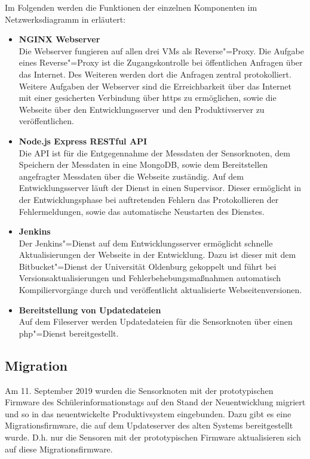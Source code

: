 \noindent
Im Folgenden werden die Funktionen der einzelnen Komponenten im Netzwerksdiagramm in  erläutert:
\begin{itemize}
\item	\textbf{NGINX Webserver}\\
Die Webserver fungieren auf allen drei VMs als Reverse"=Proxy.
Die Aufgabe eines Reverse"=Proxy ist die Zugangskontrolle bei öffentlichen Anfragen über das Internet.
Des Weiteren werden dort die Anfragen zentral protokolliert.
Weitere Aufgaben der Webserver sind die Erreichbarkeit über das Internet mit einer gesicherten Verbindung über https zu ermöglichen, sowie die Webseite über den Entwicklungsserver und den Produktivserver zu veröffentlichen.     
\item	\textbf{Node.js Express RESTful API}\\
Die API ist für die Entgegennahme der Messdaten der Sensorknoten, dem Speichern der Messdaten in eine MongoDB, sowie dem Bereitstellen angefragter Messdaten über die Webseite zuständig.
Auf dem Entwicklungsserver läuft der Dienst in einen Supervisor.
Dieser ermöglicht in der Entwicklungsphase bei auftretenden Fehlern das Protokollieren der Fehlermeldungen, sowie das automatische Neustarten des Dienstes.
\item	\textbf{Jenkins}\\  
Der Jenkins"=Dienst auf dem Entwicklungsserver ermöglicht schnelle Aktualisierungen der Webseite in der Entwicklung.
Dazu ist dieser mit dem Bitbucket"=Dienst der Universität Oldenburg gekoppelt und führt bei Versionsaktualisierungen und Fehlerbehebungsmaßnahmen automatisch Kompiliervorgänge durch und veröffentlicht  aktualisierte Webseitenversionen.
\item	\textbf{Bereitstellung von Updatedateien}\\
Auf dem Fileserver werden Updatedateien für die Sensorknoten über einen php"=Dienst bereitgestellt.     
\end{itemize}

\subsection{Migration}
Am 11. September 2019 wurden die Sensorknoten mit der prototypischen Firmware des Schülerinformationstags auf den Stand der Neuentwicklung migriert und so in das neuentwickelte Produktivsystem eingebunden.
Dazu gibt es eine Migrationsfirmware, die auf dem Updateserver des alten Systems bereitgestellt wurde.
D.h. nur die Sensoren mit der prototypischen Firmware aktualisieren sich auf diese Migrationsfirmware.

